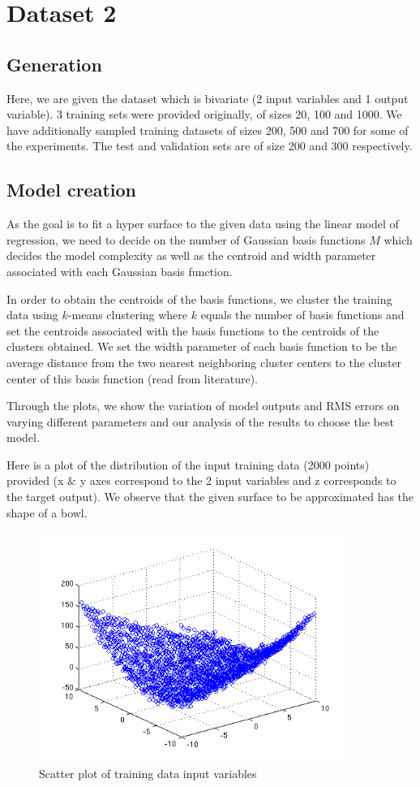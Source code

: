 \documentclass{article}
\begin{document}
\section{Dataset 2}

\subsection{Generation}
Here, we are given the dataset which is bivariate (2 input variables and 1 output variable). 3 training sets were provided originally, of sizes 20, 100 and 1000. We have additionally sampled training datasets of sizes 200, 500 and 700 for some of the experiments. The test and validation sets are of size 200 and 300 respectively.

\subsection{Model creation}

As the goal is to fit a hyper surface to the given data using the linear model of regression, we need to decide on the number of Gaussian basis functions $M$ which decides the model complexity as well as the centroid and width parameter associated with each Gaussian basis function. 

In order to obtain the centroids of the basis functions, we cluster the training data using $k$-means clustering where $k$ equals the number of basis functions and set the centroids associated with the basis functions to the centroids of the clusters obtained. We set the width parameter of each basis function to be the average distance from the two nearest neighboring cluster centers to the cluster center of this basis function (read from literature).

Through the plots, we show the variation of model outputs and RMS errors on varying different  parameters and our analysis of the results to choose the best model.

Here is a plot of the distribution of the input training data (2000 points) provided (x \& y axes correspond to the 2 input variables and z corresponds to the target output). We observe that the given surface to be approximated has the shape of a bowl.
\begin{figure}[H]
\centering
\includegraphics[width=100mm]{data_scatter}
\caption{Scatter plot of training data input variables}
\label{fig:plot}
\end{figure}
\end{document}
